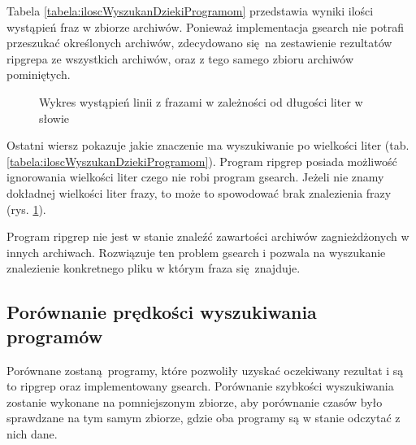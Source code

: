 Tabela \ref{tabela:iloscWyszukanDziekiProgramom} przedstawia wyniki ilości 
wystąpień fraz w zbiorze archiwów. Ponieważ implementacja gsearch nie potrafi
przeszukać określonych archiwów, zdecydowano się na zestawienie rezultatów
ripgrepa ze wszystkich archiwów, oraz z tego samego zbioru archiwów pominiętych. 

\begin{figure}[ht]
    \centering
    \caption{Wykres wystąpień linii z frazami w zależności od długości liter w słowie }
    \label{fig:wykresPorównaniaIlosciWystapień}
\end{figure}

Ostatni wiersz pokazuje jakie znaczenie ma wyszukiwanie po wielkości liter 
(tab. \ref{tabela:iloscWyszukanDziekiProgramom}). Program ripgrep posiada 
możliwość ignorowania wielkości liter czego nie robi program gsearch. Jeżeli
nie znamy dokładnej wielkości liter frazy, to może to spowodować brak 
znalezienia frazy (rys. \ref{fig:wykresPorównaniaIlosciWystapień}). 


Program ripgrep nie jest w stanie znaleźć zawartości archiwów zagnieżdżonych w
innych archiwach. Rozwiązuje ten problem gsearch i pozwala na wyszukanie 
znalezienie konkretnego pliku w którym fraza się znajduje.

\subsection{Porównanie prędkości wyszukiwania programów}

Porównane zostaną programy, które pozwoliły uzyskać oczekiwany rezultat i są to
ripgrep oraz implementowany gsearch. 
Porównanie szybkości wyszukiwania zostanie wykonane na pomniejszonym zbiorze,
aby porównanie czasów było sprawdzane na tym samym zbiorze, gdzie oba programy
są w stanie odczytać z nich dane.